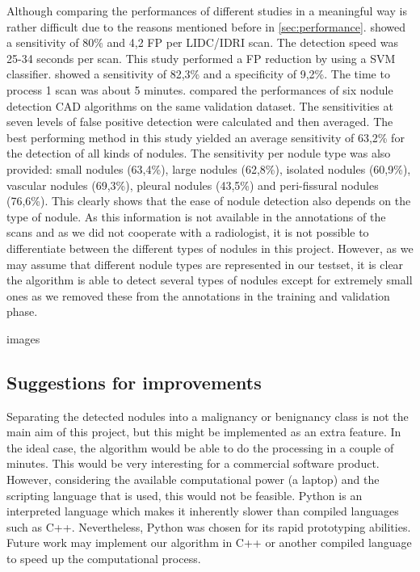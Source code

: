 Although comparing the performances of different studies in a meaningful way is
rather difficult due to the reasons mentioned before in \ref{sec:performance}.
\cite{teramoto} showed a sensitivity of 80\% and 4,2 FP per LIDC/IDRI scan.
The detection speed was 25-34 seconds per scan. This study performed a FP reduction
by using a SVM classifier. \cite{elbaz} showed a sensitivity of 82,3\% and a
specificity of 9,2\%. The time to process 1 scan was about 5 minutes.
\cite{ginneken} compared the performances of six nodule detection CAD algorithms
on the same validation dataset. The sensitivities at seven levels of false
positive detection were calculated and then averaged. The best performing method
in this study yielded an average sensitivity of 63,2\% for the detection of all
kinds of nodules. The sensitivity per nodule type was also provided: small
nodules (63,4\%), large nodules (62,8\%), isolated nodules (60,9\%), vascular
nodules (69,3\%), pleural nodules (43,5\%) and peri-fissural nodules (76,6\%).
This clearly shows that the ease of nodule detection also depends on the type of
nodule. As this information is not available in the annotations of the scans and
as we did not cooperate with a radiologist, it is not possible to differentiate
between the different types of nodules in this project. However, as we may
assume that different nodule types are represented in our testset, it is clear
the algorithm is able to detect several types of nodules except for extremely
small ones as we removed these from the annotations in the training and
validation phase.








images
\subsection{Suggestions for improvements}
Separating the detected nodules into a malignancy or benignancy class is not the
main aim of this project, but this might be implemented as an extra feature.
In the ideal case, the algorithm would be able to do the processing in a couple
of minutes. This would be very interesting for a commercial software product.
However, considering the available computational power (a laptop) and the
scripting language that is used, this would not be feasible. Python is an
interpreted language which makes it inherently slower than compiled languages
such as C++. Nevertheless, Python was chosen for its rapid prototyping
abilities. Future work may implement our algorithm in C++ or another compiled
language to speed up the computational process.




